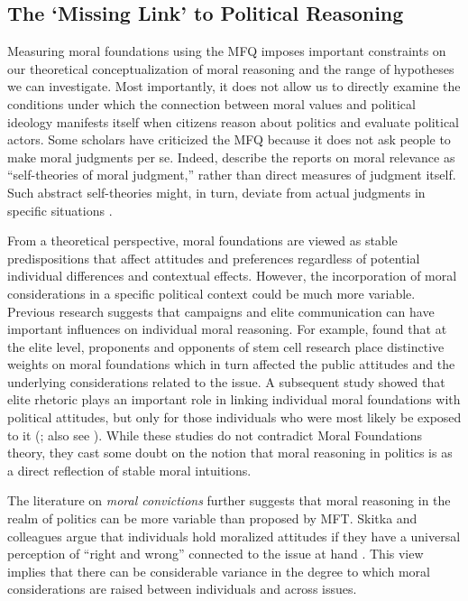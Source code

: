 \documentclass[12pt]{article}
\begin{document}
\subsection{The `Missing Link' to Political Reasoning}

Measuring moral foundations using the MFQ imposes important constraints on our theoretical conceptualization of moral reasoning and the range of hypotheses we can investigate. Most importantly, it does not allow us to directly examine the conditions under which the connection between moral values and political ideology manifests itself when citizens reason about politics and evaluate political actors. Some scholars have criticized the MFQ because it does not ask people to make moral judgments per se. Indeed, \citet[1031]{graham2009liberals} describe the reports on moral relevance as ``self-theories of moral judgment,'' rather than direct measures of judgment itself. Such abstract self-theories might, in turn, deviate from actual judgments in specific situations \citep[see][for an alternative way to measure moral judgment]{clifford2015moral}.

From a theoretical perspective, moral foundations are viewed as stable predispositions that affect attitudes and preferences regardless of potential individual differences and contextual effects. However, the incorporation of moral considerations in a specific political context could be much more variable. Previous research suggests that campaigns and elite communication can have important influences on individual moral reasoning. For example, \citet{clifford2013words} found that at the elite level, proponents and opponents of stem cell research place distinctive weights on moral foundations which in turn affected the public attitudes and the underlying considerations related to the issue. A subsequent study showed that elite rhetoric plays an important role in linking individual moral foundations with political attitudes, but only for those individuals who were most likely be exposed to it (\citealt{clifford2015concerns}; also see \citealt{day2014shifting}). While these studies do not contradict Moral Foundations theory, they cast some doubt on the notion that moral reasoning in politics is as a direct reflection of stable moral intuitions. 

The literature on \textit{moral convictions} further suggests that moral reasoning in the realm of politics can be more variable than proposed by MFT. Skitka and colleagues argue that individuals hold moralized attitudes if they have a universal perception of ``right and wrong'' connected to the issue at hand \citep{skitka2005moral,mullen2006exploring,skitka2010psychology}. This view implies that there can be considerable variance in the degree to which moral considerations are raised between individuals and across issues.
\end{document}
